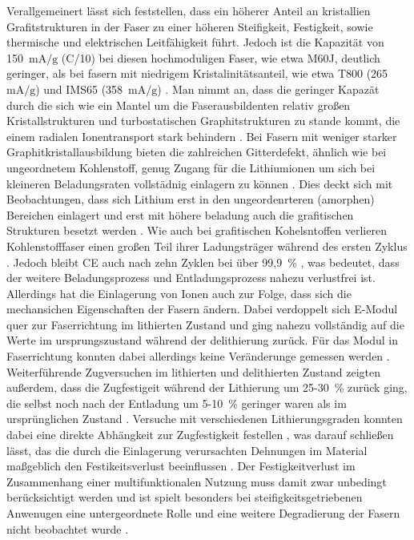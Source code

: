 Verallgemeinert lässt sich feststellen, dass ein höherer Anteil an kristallien Grafitstrukturen in der Faser zu einer höheren Steifigkeit, Festigkeit, sowie thermische und elektrischen Leitfähigkeit führt. Jedoch ist die Kapazität von 150~$\si{\mA \per \g}$ (C/10) bei diesen hochmoduligen Faser, wie etwa M60J, deutlich geringer, als bei fasern mit niedrigem Kristalinitätsanteil, wie etwa T800 (265~$\si{\mA \per \g}$) und IMS65 (358~$\si{\mA \per \g}$) \cite{Fredi2018}. Man nimmt an, dass die geringer Kapazät durch die sich wie ein Mantel um die Faserausbildenten relativ großen Kristallstrukturen und turbostatischen Graphitstrukturen zu stande kommt, die einem radialen Ionentransport stark behindern \cite{Zenkert2024}. Bei Fasern mit weniger starker Graphitkristallausbildung bieten die zahlreichen Gitterdefekt, ähnlich wie bei ungeordnetem Kohlenstoff, genug Zugang für die Lithiumionen um sich bei kleineren Beladungsraten vollstädnig einlagern zu können \cite{Fredi2018}. Dies deckt sich mit Beobachtungen, dass sich Lithium erst in den ungeordenrteren (amorphen) Bereichen einlagert und erst mit höhere beladung auch die grafitischen Strukturen besetzt werden \cite{Fang2022}. Wie auch bei grafitischen Kohelsntoffen verlieren Kohlenstofffaser einen großen Teil ihrer Ladungsträger während des ersten Zyklus \cite{Jacques2013}. Jedoch bleibt CE auch nach zehn Zyklen bei über 99,9~\% \cite{Hagberg2016}, was bedeutet, dass der weitere Beladungsprozess und Entladungsprozess nahezu verlustfrei ist. Allerdings hat die Einlagerung von Ionen auch zur Folge, dass sich die mechansichen Eigenschaften der Fasern ändern. Dabei verdoppelt sich E-Modul quer zur Faserrichtung im lithierten Zustand und ging nahezu vollständig auf die Werte im ursprungszustand während der delithierung zurück. Für das Modul in Faserrichtung konnten dabei allerdings keine Veränderunge gemessen werden \cite{Duan2021}. Weiterführende Zugversuchen im lithierten und delithierten Zustand zeigten außerdem, dass die Zugfestigeit während der Lithierung um 25-30~\% zurück ging, die selbst noch nach der Entladung um 5-10~\% geringer waren als im ursprünglichen Zustand \cite{Jacques2012}. Versuche mit verschiedenen Lithierungsgraden konnten dabei eine direkte Abhängkeit zur Zugfestigkeit festellen \cite{Jacques2014}, was darauf schließen lässt, das die durch die Einlagerung verursachten Dehnungen im Material maßgeblich den Festikeitsverlust beeinflussen \cite{Zenkert2024}. Der Festigkeitverlust im Zusammenhang einer multifunktionalen Nutzung muss damit zwar unbedingt berücksichtigt werden und ist spielt besonders bei steifigkeitsgetriebenen Anwenugen eine untergeordnete Rolle und eine weitere Degradierung der Fasern nicht beobachtet wurde \cite{Zenkert2024}.


